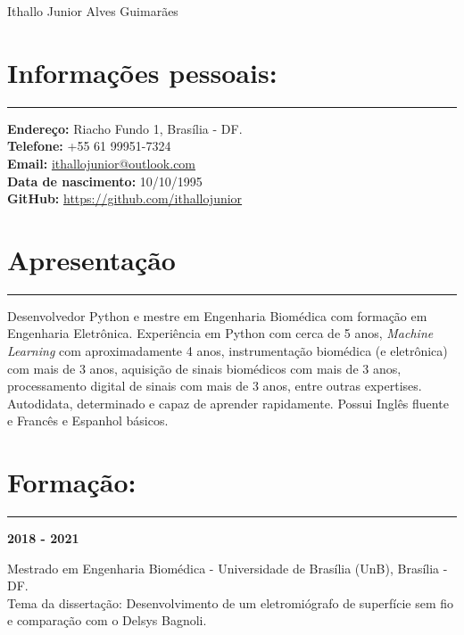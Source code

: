 \documentclass[11pt]{article}
\begin{document}
\begin{center}
\huge{Ithallo Junior Alves Guimarães}
\end{center}

\section{Informações pessoais:}
\hrule \vspace{0.1cm}
\begin{addmargin}{0.5cm}

\textbf{Endereço:}  Riacho Fundo 1, Brasília - DF. \\
\textbf{Telefone:}  +55 61 99951-7324 \\
\textbf{Email:}   \href{maito:ithallojunior@outlook.com}{ithallojunior@outlook.com} \\
\textbf{Data de nascimento:} 10/10/1995 \\
\textbf{GitHub:} \url{https://github.com/ithallojunior}

\end{addmargin}

\section{Apresentação}
\hrule \vspace{0.1cm}

\begin{addmargin}{0.5cm}

Desenvolvedor Python e mestre em Engenharia Biomédica com formação em Engenharia Eletrônica. 
Experiência em Python com cerca de 5 anos, 
\textit{Machine Learning} com aproximadamente 4 anos, instrumentação biomédica (e 
eletrônica) com mais de 3 anos, 
aquisição de sinais biomédicos com mais de 3 anos, processamento digital de sinais
com mais de 3 anos, entre outras expertises. 
Autodidata, determinado e 
capaz de aprender rapidamente. Possui Inglês fluente e Francês e Espanhol básicos.

\end{addmargin}

\section{Formação:}
\hrule \vspace{0.1cm}

\textbf{2018 - 2021}
\begin{addmargin}{0.5cm}
Mestrado em Engenharia Biomédica - Universidade de Brasília (UnB), Brasília - DF.\\ 
Tema da dissertação: Desenvolvimento de um eletromiógrafo de superfície sem fio e
comparação com o Delsys Bagnoli.\\
\end{addmargin}
\end{document}
